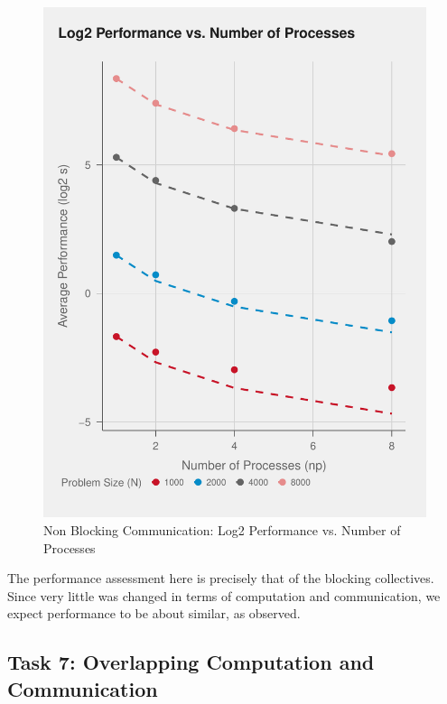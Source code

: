 \documentclass{article}
\begin{document}
\begin{figure}[H]
   \centering
   \includegraphics[scale=0.7]{../part2/out/np-6.pdf} 
   \caption{Non Blocking Communication: Log2 Performance vs. Number of Processes}
\end{figure}
\noindent The performance assessment here is precisely that of the blocking collectives. Since 
very little was changed in terms of computation and communication, we expect performance 
to be about similar, as observed.

\subsection*{Task 7: Overlapping Computation and Communication}
\end{document}
